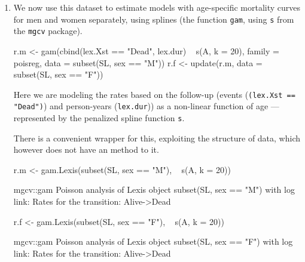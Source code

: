 \begin{enumerate}[resume]




\item We now use this dataset to estimate models with age-specific
  mortality curves for men and women separately, using splines (the
  function \texttt{gam}, using \texttt{s} from the \texttt{mgcv}
  package).
\begin{Schunk}
\begin{Sinput}
 r.m <- gam(cbind(lex.Xst == "Dead", lex.dur) ~ s(A, k = 20),
             family = poisreg,
               data = subset(SL, sex == "M"))
 r.f <- update(r.m, data = subset(SL, sex == "F"))
\end{Sinput}
\end{Schunk}
Here we are modeling the rates based on the follow-up (events
(\texttt{(lex.Xst == "Dead")}) and person-years (\texttt{lex.dur})) as
a non-linear function of age --- represented by the penalized spline
function \texttt{s}.

There is a convenient wrapper for this, exploiting the 
structure of data, which however does not have an  method
to it.
\begin{Schunk}
\begin{Sinput}
 r.m <- gam.Lexis(subset(SL, sex == "M"), ~ s(A, k = 20))
\end{Sinput}
\begin{Soutput}
mgcv::gam Poisson analysis of Lexis object subset(SL, sex == "M") with log link:
Rates for the transition:
Alive->Dead
\end{Soutput}
\begin{Sinput}
 r.f <- gam.Lexis(subset(SL, sex == "F"), ~ s(A, k = 20))
\end{Sinput}
\begin{Soutput}
mgcv::gam Poisson analysis of Lexis object subset(SL, sex == "F") with log link:
Rates for the transition:
Alive->Dead
\end{Soutput}
\end{Schunk}


\end{enumerate}
